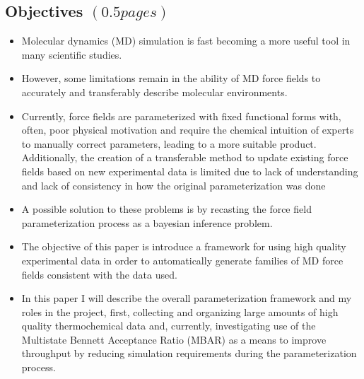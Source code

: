 \documentclass[aps,pre,onecolumn,nofootinbib,superscriptaddress,linenumbers,12pt, draft,tightenlines]{revtex4-1}
\begin{document}
\subsection{Objectives $\left(0.5 pages\right)$}
\begin{itemize}
 \item Molecular dynamics (MD) simulation is fast becoming a more useful tool in many scientific studies.
 \item However, some limitations remain in the ability of MD force fields to accurately and transferably describe molecular environments.
 \item Currently, force fields are parameterized with fixed functional forms with, often, poor physical motivation and require the chemical intuition of experts to manually correct parameters, leading to a more suitable product. Additionally, the creation of a transferable method to update existing force fields based on new experimental data is limited due to lack of understanding and lack of consistency in how the original parameterization was done 
 \item A possible solution to these problems is by recasting the force field parameterization process as a bayesian inference problem.
 \item The objective of this paper is introduce a framework for using high quality experimental data in order to automatically generate families of MD force fields consistent with the data used.
 \item In this paper I will describe the overall parameterization framework and my roles in the project, first, collecting and organizing large amounts of high quality thermochemical data and, currently, investigating use of the Multistate Bennett Acceptance Ratio (MBAR) as a means to improve throughput by reducing simulation requirements during the parameterization process.      
\end{itemize}
\end{document}
